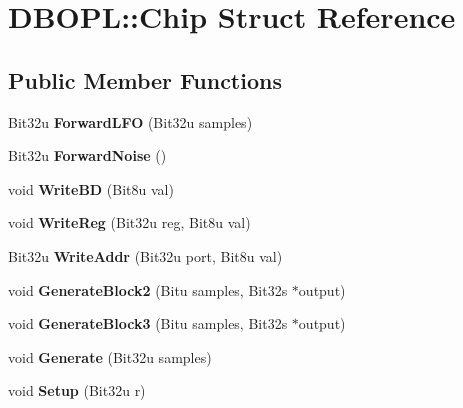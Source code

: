 \hypertarget{structDBOPL_1_1Chip}{\section{D\-B\-O\-P\-L\-:\-:Chip Struct Reference}
\label{structDBOPL_1_1Chip}
}
\subsection*{Public Member Functions}
\begin{DoxyCompactItemize}
\item 
\hypertarget{structDBOPL_1_1Chip_aa6fa687111a426a5f78e167fa257ab3c}{Bit32u {\bfseries Forward\-L\-F\-O} (Bit32u samples)}\label{structDBOPL_1_1Chip_aa6fa687111a426a5f78e167fa257ab3c}

\item 
\hypertarget{structDBOPL_1_1Chip_a24786d7a165991bee7de4fcc0d771b51}{Bit32u {\bfseries Forward\-Noise} ()}\label{structDBOPL_1_1Chip_a24786d7a165991bee7de4fcc0d771b51}

\item 
\hypertarget{structDBOPL_1_1Chip_a2860097b5662864a601a5e88366d830e}{void {\bfseries Write\-B\-D} (Bit8u val)}\label{structDBOPL_1_1Chip_a2860097b5662864a601a5e88366d830e}

\item 
\hypertarget{structDBOPL_1_1Chip_a91898e7f05d8dffc30731970a554ef7e}{void {\bfseries Write\-Reg} (Bit32u reg, Bit8u val)}\label{structDBOPL_1_1Chip_a91898e7f05d8dffc30731970a554ef7e}

\item 
\hypertarget{structDBOPL_1_1Chip_ab7a01561768354f16b8851a0d21b7a2c}{Bit32u {\bfseries Write\-Addr} (Bit32u port, Bit8u val)}\label{structDBOPL_1_1Chip_ab7a01561768354f16b8851a0d21b7a2c}

\item 
\hypertarget{structDBOPL_1_1Chip_a306dc034dce06ffed5b08e6295100b70}{void {\bfseries Generate\-Block2} (Bitu samples, Bit32s $\ast$output)}\label{structDBOPL_1_1Chip_a306dc034dce06ffed5b08e6295100b70}

\item 
\hypertarget{structDBOPL_1_1Chip_aa2ce55695961a65cc79e86ff110cdb35}{void {\bfseries Generate\-Block3} (Bitu samples, Bit32s $\ast$output)}\label{structDBOPL_1_1Chip_aa2ce55695961a65cc79e86ff110cdb35}

\item 
\hypertarget{structDBOPL_1_1Chip_aa5e8f70f9b01aba04e5f0c78e96414e8}{void {\bfseries Generate} (Bit32u samples)}\label{structDBOPL_1_1Chip_aa5e8f70f9b01aba04e5f0c78e96414e8}

\item 
\hypertarget{structDBOPL_1_1Chip_a7ae0e48e86d15d09fb90deb101258eef}{void {\bfseries Setup} (Bit32u r)}\label{structDBOPL_1_1Chip_a7ae0e48e86d15d09fb90deb101258eef}

\end{DoxyCompactItemize}
